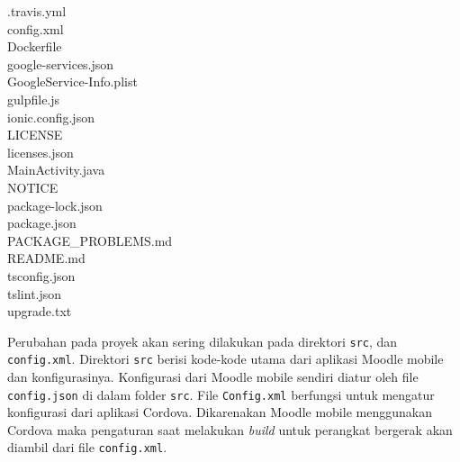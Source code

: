 \begin{center}
\begin{minipage}{.6\textwidth}
.travis.yml                                          \\                
config.xml                                               \\  
Dockerfile                                               \\
google-services.json                            \\                     
GoogleService-Info.plist                        \\                     
gulpfile.js                                            \\              
ionic.config.json                                       \\             
LICENSE                                                  \\            
licenses.json                                              \\          
MainActivity.java                                       \\             
NOTICE                                                         \\      
package-lock.json                                     \\               
package.json                                            \\             
PACKAGE\_PROBLEMS.md                        \\                          
README.md                                        \\                                                                     
tsconfig.json                                           \\             
tslint.json                                             \\             
upgrade.txt                                     \\
\end{minipage}                                                          
\end{center}
Perubahan pada proyek akan sering dilakukan pada direktori \texttt{src}, dan \texttt{config.xml}. Direktori \texttt{src} berisi kode-kode utama dari aplikasi Moodle mobile dan konfigurasinya. Konfigurasi dari Moodle mobile sendiri diatur oleh file \texttt{config.json} di dalam folder \texttt{src}. File \texttt{Config.xml} berfungsi untuk mengatur konfigurasi dari aplikasi Cordova. Dikarenakan Moodle mobile menggunakan Cordova maka pengaturan saat melakukan \textit{build} untuk perangkat bergerak akan diambil dari file \texttt{config.xml}. 

